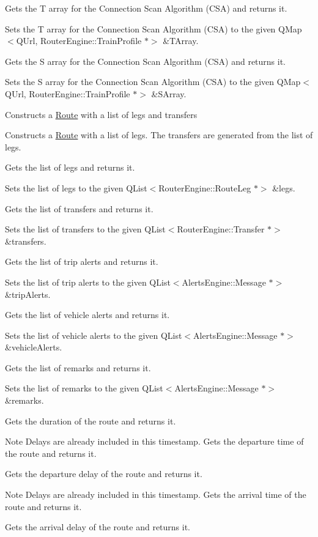 Gets the T array for the Connection Scan Algorithm (C\+SA) and returns it.

Sets the T array for the Connection Scan Algorithm (C\+SA) to the given Q\+Map$<$\+Q\+Url, Router\+Engine\+::\+Train\+Profile $\ast$$>$ \&T\+Array.

Gets the S array for the Connection Scan Algorithm (C\+SA) and returns it.

Sets the S array for the Connection Scan Algorithm (C\+SA) to the given Q\+Map$<$\+Q\+Url, Router\+Engine\+::\+Train\+Profile $\ast$$>$ \&S\+Array.

Constructs a \mbox{\hyperlink{classRouterEngine_1_1Route}{Route}} with a list of legs and transfers

Constructs a \mbox{\hyperlink{classRouterEngine_1_1Route}{Route}} with a list of legs. The transfers are generated from the list of legs.

Gets the list of legs and returns it.

Sets the list of legs to the given Q\+List$<$\+Router\+Engine\+::\+Route\+Leg $\ast$$>$ \&legs.

Gets the list of transfers and returns it.

Sets the list of transfers to the given Q\+List$<$\+Router\+Engine\+::\+Transfer $\ast$$>$ \&transfers.

Gets the list of trip alerts and returns it.

Sets the list of trip alerts to the given Q\+List$<$\+Alerts\+Engine\+::\+Message $\ast$$>$ \&trip\+Alerts.

Gets the list of vehicle alerts and returns it.

Sets the list of vehicle alerts to the given Q\+List$<$\+Alerts\+Engine\+::\+Message $\ast$$>$ \&vehicle\+Alerts.

Gets the list of remarks and returns it.

Sets the list of remarks to the given Q\+List$<$\+Alerts\+Engine\+::\+Message $\ast$$>$ \&remarks.

Gets the duration of the route and returns it.

\begin{DoxyNote}{Note}
Delays are already included in this timestamp. Gets the departure time of the route and returns it.
\end{DoxyNote}
Gets the departure delay of the route and returns it.

\begin{DoxyNote}{Note}
Delays are already included in this timestamp. Gets the arrival time of the route and returns it.
\end{DoxyNote}
Gets the arrival delay of the route and returns it.

